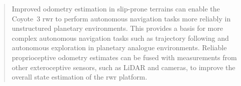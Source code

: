 \documentclass[report.tex]{subfiles}
\begin{document}
\begin{abstract}
        Improved odometry estimation in slip-prone terrains can enable the Coyote~3 \gls{rwr} to perform autonomous navigation tasks more reliably in unstructured planetary environments. This provides a basis for more complex autonomous navigation tasks such as trajectory following and autonomous exploration in planetary analogue environments. Reliable proprioceptive odometry estimates can be fused with measurements from other exteroceptive sensors, such as LiDAR and cameras, to improve the overall state estimation of the \gls{rwr} platform.
        
    \end{abstract}
\end{document}
